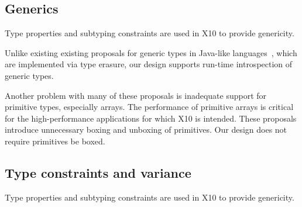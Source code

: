 \documentclass[preprint,nocopyrightspace,9pt]{sigplanconf}
\begin{document}
\subsection{Generics}

Type properties and subtyping constraints are used in X10 to 
provide genericity.

Unlike existing 
existing proposals for generic types in
Java-like
languages~\cite{Java3,adding-wildcards,GJ,Pizza,polyj,thorup97,allen03,allen04,csharp,emir06,scala},
which 
are implemented via type erasure,
our design supports run-time introspection of generic types.

Another problem with many of these proposals is inadequate support
for primitive types, especially arrays. The performance of primitive arrays is
critical for the high-performance applications for which
X10 is intended. These proposals introduce unnecessary boxing
and unboxing of primitives.
Our design does not require primitives be boxed.

\subsection{Type constraints and variance}
\label{sec:variance}

Type properties and subtyping constraints are used in X10 to 
provide genericity.
\end{document}
